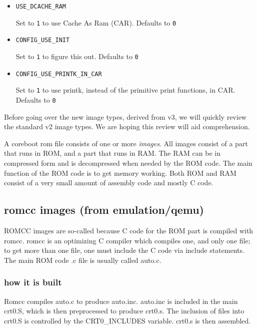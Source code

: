\documentclass[titlepage,12pt]{article}
\begin{document}
\begin{itemize}
\item \begin{verbatim}USE_DCACHE_RAM\end{verbatim}

Set to \texttt{1} to use Cache As Ram (CAR). Defaults to \texttt{0}

\item \begin{verbatim}CONFIG_USE_INIT\end{verbatim}

Set to \texttt{1} to figure this out. Defaults to \texttt{0}

\item \begin{verbatim}CONFIG_USE_PRINTK_IN_CAR\end{verbatim}

Set to \texttt{1} to use printk, instead of the primitive print functions, in CAR. Defaults to \texttt{0}

\end{itemize}

Before going over the new image types, derived from v3, we will quickly review the standard v2 image types. We are hoping this review will
aid comprehension. 

A coreboot rom file consists of one or more \textit{images}. All images consist of a part that runs in ROM, and a part that runs in RAM. The RAM can be in  compressed form and is decompressed when needed by the ROM code. The main function of the ROM code is to get memory working. Both ROM and RAM consist of a very small amount of assembly code and mostly C code. 

\subsection{romcc images (from emulation/qemu)}
ROMCC images are so-called because C code for the ROM part is compiled with romcc. romcc is an optimizing C compiler which compiles one, and only 
one file; to get more than one file, one must include the C code via include statements. The main ROM code .c file is usually called auto.c. 
\subsubsection{how it is built}
Romcc compiles auto.c to produce auto.inc. auto.inc is included in the main crt0.S, which is then preprocessed to produce crt0.s. The inclusion of files into crt0.S is controlled by the CRT0\_INCLUDES variable. crt0.s is then assembled. 
\end{document}
